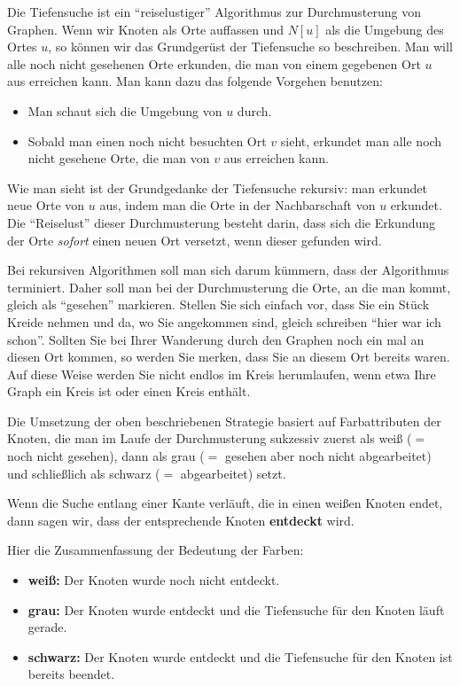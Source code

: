 \begin{bem} 
	Die Tiefensuche ist ein ``reiselustiger'' Algorithmus zur Durchmusterung von Graphen. Wenn wir Knoten als Orte auffassen und $N[u]$ als die Umgebung des Ortes $u$, so können wir das Grundgerüst der Tiefensuche so beschreiben. Man will alle noch nicht gesehenen Orte erkunden, die man von einem gegebenen Ort $u$ aus erreichen kann. Man kann dazu das folgende Vorgehen benutzen: 
	\begin{itemize} 
			\item Man schaut sich die Umgebung von $u$ durch. 
			\item Sobald man einen  noch nicht besuchten Ort $v$ sieht, erkundet man alle noch nicht gesehene Orte, die man von $v$ aus erreichen kann. 
	\end{itemize} 
	Wie man sieht ist der Grundgedanke  der Tiefensuche rekursiv: man erkundet neue Orte von $u$ aus, indem man die Orte in der Nachbarschaft von $u$ erkundet. Die ``Reiselust'' dieser Durchmusterung besteht darin, dass sich die Erkundung der Orte \emph{sofort} einen neuen Ort versetzt, wenn dieser gefunden wird.  
	
	
	Bei rekursiven Algorithmen soll man sich darum kümmern, dass der Algorithmus terminiert. Daher soll man bei der Durchmusterung die Orte, an die man kommt, gleich als ``gesehen'' markieren.  Stellen Sie sich einfach vor, dass Sie ein Stück Kreide nehmen und da, wo Sie angekommen sind, gleich schreiben ``hier war ich schon''. Sollten Sie bei Ihrer Wanderung durch den Graphen noch ein mal an diesen Ort kommen,  so werden Sie merken, dass Sie an diesem Ort bereits waren. Auf diese Weise werden Sie nicht endlos im Kreis herumlaufen, wenn etwa Ihre Graph ein Kreis ist oder einen Kreis enthält. 
	
	Die Umsetzung der oben beschriebenen Strategie basiert auf Farbattributen der Knoten, die man im Laufe der Durchmusterung sukzessiv zuerst als weiß ($=$ noch nicht gesehen), dann als  grau ($=$ gesehen aber noch nicht abgearbeitet) und schließlich als  schwarz ($=$ abgearbeitet) setzt. 
	
	Wenn die Suche entlang einer Kante verläuft, die in einen weißen Knoten endet, dann sagen wir, dass der entsprechende Knoten \textbf{entdeckt} wird.

Hier die Zusammenfassung der Bedeutung der Farben: 
\begin{itemize}
\setlength{\itemindent}{30pt}
	\item[] {\bfseries weiß:} Der Knoten wurde noch nicht entdeckt. 
	\item[] {\bfseries grau:} Der Knoten wurde entdeckt und die Tiefensuche für den Knoten läuft gerade.
	\item[] {\bfseries schwarz:} Der Knoten wurde entdeckt und die Tiefensuche für den Knoten ist bereits beendet.
\end{itemize}


\end{bem}
